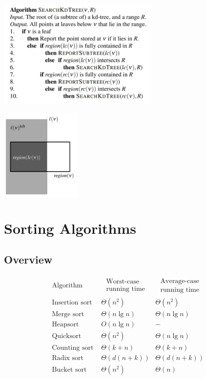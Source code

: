 \documentclass[10pt,a4paper,twocolumn]{article}
\begin{document}
\begin{center}
	\includegraphics[width=8cm]{images/search-kd-tree}
\end{center}

\begin{center}
	\includegraphics[width=4cm]{images/sarch-kd-tree-scheme}
\end{center}


\section{Sorting Algorithms}
\subsection{Overview}$$
\begin{array}{l|ll}\text { Algorithm } & \begin{array}{l}\text { Worst-case } \\ \text { running time }\end{array} & \begin{array}{l}\text { Average-case } \\ \text { running time }\end{array} \\ \hline \text { Insertion sort } & \Theta\left(n^{2}\right) & \Theta\left(n^{2}\right) \\ \text { Merge sort } & \Theta(n \lg n) & \Theta(n \lg n) \\ \text { Heapsort } & O(n \lg n) & - \\ \text { Quicksort } & \Theta\left(n^{2}\right) & \Theta(n \lg n) \quad \\ \text { Counting sort } & \Theta(k+n) & \Theta(k+n) \\ \text { Radix sort } & \Theta(d(n+k)) & \Theta(d(n+k)) \\ \text { Bucket sort } & \Theta\left(n^{2}\right) & \Theta(n) \quad \end{array}
$$
\end{document}
